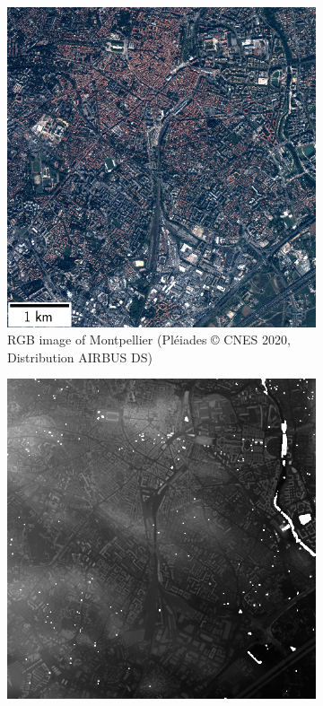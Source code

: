 \begin{figure}
    \centering
    \begin{subfigure}[t]{0.48\linewidth}
        \flushleft
        \includegraphics[width=\linewidth]{Images/Chap_6/miniature_Montpellier.png}
        \caption{RGB image of Montpellier (Pléiades © CNES 2020, Distribution AIRBUS DS)}
        \label{fig:miniature_Montpellier_rgb}
    \end{subfigure}\hfill
    \begin{subfigure}[t]{0.48\linewidth}
        \flushright
        \includegraphics[width=\linewidth]{Images/Chap_6/miniature_Montpellier_gt.png}

\end{subfigure}
\end{figure}
